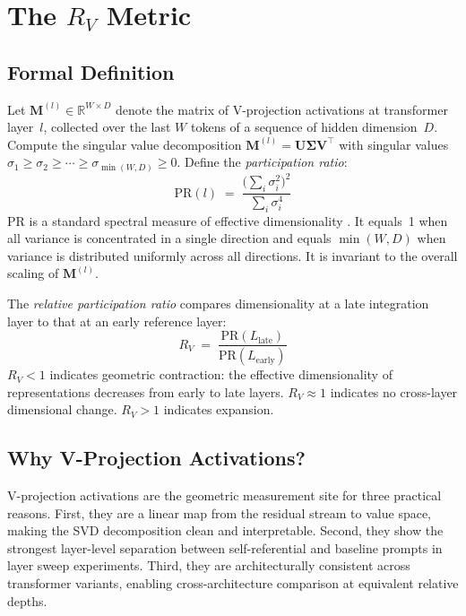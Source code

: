 \documentclass{article}
\newcommand{\RV}{R_V}
\newcommand{\PR}{\text{PR}}
\begin{document}
\section{The $\RV$ Metric}
\label{sec:metric}

\subsection{Formal Definition}

Let $\mathbf{M}^{(l)} \in \mathbb{R}^{W \times D}$ denote the matrix of V-projection activations at
transformer layer~$l$, collected over the last $W$ tokens of a sequence of hidden dimension~$D$.
Compute the singular value decomposition $\mathbf{M}^{(l)} = \mathbf{U} \boldsymbol{\Sigma} \mathbf{V}^\top$
with singular values $\sigma_1 \geq \sigma_2 \geq \cdots \geq \sigma_{\min(W,D)} \geq 0$.
Define the \emph{participation ratio}:
\begin{equation}
    \PR(l) \;=\; \frac{\bigl(\sum_i \sigma_i^2\bigr)^2}{\sum_i \sigma_i^4}
    \label{eq:pr}
\end{equation}
$\PR$ is a standard spectral measure of effective dimensionality \citep{gao2017theory,
roy2007effective}.
It equals~1 when all variance is concentrated in a single direction and equals $\min(W, D)$ when
variance is distributed uniformly across all directions.
It is invariant to the overall scaling of $\mathbf{M}^{(l)}$.

The \emph{relative participation ratio} compares dimensionality at a late integration layer to that
at an early reference layer:
\begin{equation}
    \RV \;=\; \frac{\PR(L_\mathrm{late})}{\PR(L_\mathrm{early})}
    \label{eq:rv}
\end{equation}
$\RV < 1$ indicates geometric contraction: the effective dimensionality of representations decreases
from early to late layers.
$\RV \approx 1$ indicates no cross-layer dimensional change.
$\RV > 1$ indicates expansion.

\subsection{Why V-Projection Activations?}

V-projection activations are the geometric measurement site for three practical reasons.
First, they are a linear map from the residual stream to value space, making the SVD decomposition
clean and interpretable.
Second, they show the strongest layer-level separation between self-referential and baseline prompts
in layer sweep experiments.
Third, they are architecturally consistent across transformer variants, enabling cross-architecture
comparison at equivalent relative depths.
\end{document}
